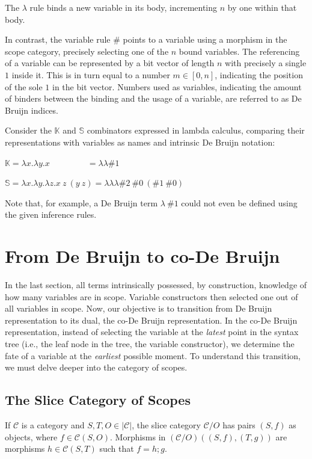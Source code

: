 \documentclass[runningheads]{llncs}
\begin{document}
The $λ$ rule binds a new variable in its body, incrementing $n$ by one within that body.

In contrast, the variable rule $\#$ points to a variable using a morphism in the scope category, precisely selecting one of the $n$ bound variables.
The referencing of a variable can be represented by a bit vector of length $n$ with precisely a single $1$ inside it.
This is in turn equal to a number $m ∈ [0, n]$, indicating the position of the sole $1$ in the bit vector.
Numbers used as variables, indicating the amount of binders between the binding and the usage of a variable, are referred to as De Bruijn indices.

\begin{example}
  Consider the $𝕂$ and $𝕊$ combinators expressed in lambda calculus, comparing their representations with variables as names and intrinsic De Bruijn notation:

  \quad $𝕂 = λx. λy. x \quad \quad \quad \quad \ \ = λ  λ \#1$

  \quad $𝕊 = λx. λy. λz. x \ z \ (y \ z) = λ λ λ \#2 \ \#0 \ (\#1 \ \#0)$

  \noindent Note that, for example, a De Bruijn term $λ \ \#1$ could not even be defined using the given inference rules.
\end{example}

\section{From De Bruijn to co-De Bruijn}
In the last section, all terms intrinsically possessed, by construction, knowledge of how many variables are in scope.
Variable constructors then selected one out of all variables in scope.
Now, our objective is to transition from De Bruijn representation to its dual, the co-De Bruijn representation.
In the co-De Bruijn representation, instead of selecting the variable at the \emph{latest} point in the syntax tree (i.e., the leaf node in the tree, the variable constructor), we determine the fate of a variable at the \emph{earliest} possible moment.
To understand this transition, we must delve deeper into the category of scopes.

\subsection{The Slice Category of Scopes}
\begin{definition}
  If $𝒞$ is a category and $S, T, O ∈ |𝒞|$, the slice category $𝒞/O$ has pairs $(S, f)$ as objects, where $f ∈ 𝒞(S, O)$. Morphisms in $(𝒞/O)((S, f), (T, g))$ are morphisms $h ∈ 𝒞(S, T)$ such that $f = h;g$.
\end{definition}
\end{document}
